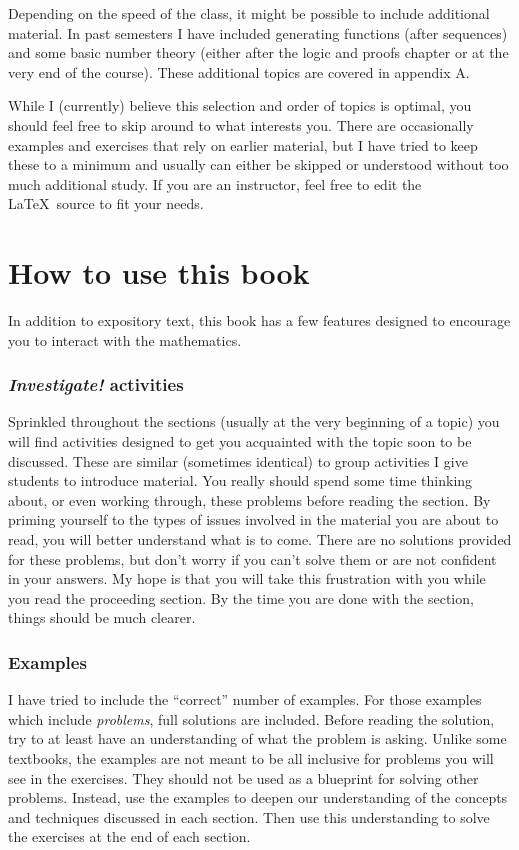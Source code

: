 Depending on the speed of the class, it might be possible to include additional material.  In past semesters I have included generating functions (after sequences) and some basic number theory (either after the logic and proofs chapter or at the very end of the course).  These additional topics are covered in appendix A.

While I (currently) believe this selection and order of topics is optimal, you should feel free to skip around to what interests you.  There are occasionally examples and exercises that rely on earlier material, but I have tried to keep these to a minimum and usually can either be skipped or understood without too much additional study.  If you are an instructor, feel free to edit the \LaTeX\ source to fit your needs.


\section*{How to use this book}

In addition to expository text, this book has a few features designed to encourage you to interact with the mathematics.

\subsubsection*{\textit{Investigate!} activities}  Sprinkled throughout the sections (usually at the very beginning of a topic) you will find activities designed to get you acquainted with the topic soon to be discussed.  These are similar (sometimes identical) to group activities I give students to introduce material.  You really should spend some time thinking about, or even working through, these problems before reading the section.  By priming yourself to the types of issues involved in the material you are about to read, you will better understand what is to come.  There are no solutions provided for these problems, but don't worry if you can't solve them or are not confident in your answers.  My hope is that you will take this frustration with you while you read the proceeding section.  By the time you are done with the section, things should be much clearer.

\subsubsection*{Examples}

I have tried to include the ``correct'' number of examples.  For those examples which include \emph{problems}, full solutions are included. Before reading the solution, try to at least have an understanding of what the problem is asking.  Unlike some textbooks, the examples are not meant to be all inclusive for problems you will see in the exercises.  They should not be used as a blueprint for solving other problems.  Instead, use the examples to deepen our understanding of the concepts and techniques discussed in each section.  Then use this understanding to solve the exercises at the end of each section.

